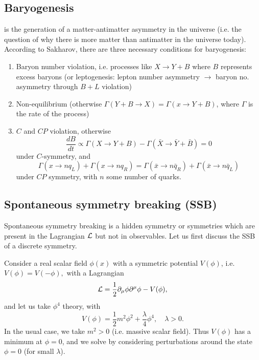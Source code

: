 \subsection*{Baryogenesis}  is the generation of a matter-antimatter asymmetry in the universe (i.e. the question of why there is more matter than antimatter in the universe today). According to Sakharov, there are three necessary conditions for baryogenesis:
\begin{enumerate}
    \item Baryon number violation, i.e. processes like $X\to Y+B$ where $B$ represents excess baryons (or leptogenesis: lepton number asymmetry $\to$ baryon no. asymmetry through $B+L$ violation)
    \item Non-equilibrium (otherwise $\Gamma(Y+B\to X)=\Gamma(x\to Y+B)$, where $\Gamma$ is the rate of the process)
    \item $C$ and $CP$ violation, otherwise
    \begin{equation*}
        \frac{dB}{dt} \propto \Gamma(X\to Y+B) -\Gamma(\bar X \to \bar Y +\bar B)=0
    \end{equation*}
    under $C$-symmetry, and
    \begin{equation*}
        \Gamma(x\to n q_L)+\Gamma(x\to n q_R) = \Gamma(\bar x \to n \bar q_R)+ \Gamma(\bar x \to n \bar q_L)
    \end{equation*}
    under $CP$ symmetry, with $n$ some number of quarks.
\end{enumerate}

\subsection*{Spontaneous symmetry breaking (SSB)}
Spontaneous symmetry breaking is a hidden symmetry or symmetries which are present in the Lagrangian $\mathcal L$ but not in observables. Let us first discuss the SSB of a discrete symmetry.

Consider a real scalar field $\phi(x)$ with a symmetric  potential $V(\phi)$, i.e. $V(\phi)=V(-\phi),$ with a Lagrangian
\begin{equation}
    \mathcal L =\frac{1}{2} \partial_\mu \phi \partial^\mu \phi - V(\phi),
\end{equation}
and let us take $\phi^4$ theory, with
\begin{equation}
    V(\phi)=\frac{1}{2} m^2 \phi^2 + \frac{\lambda}{4}\phi^4, \quad \lambda >0.
\end{equation}
In the usual case, we take $m^2>0$ (i.e. massive scalar field). Thus $V(\phi)$ has a minimum at $\phi=0$, and we solve by considering perturbations around the state  $\phi=0$ (for small $\lambda$).

